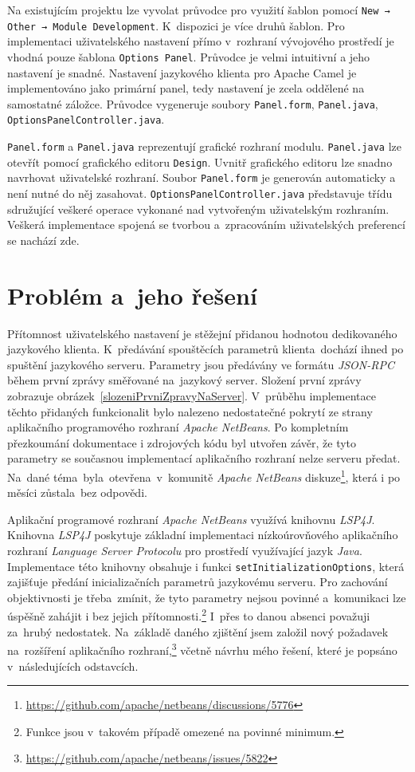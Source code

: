Na existujícím projektu lze vyvolat průvodce pro využití šablon pomocí \texttt{New → Other → Module Development}. K~dispozici je více druhů šablon. Pro implementaci uživatelského nastavení přímo v~rozhraní vývojového prostředí je vhodná pouze šablona \texttt{Options Panel}. Průvodce je velmi intuitivní a jeho nastavení je snadné. Nastavení jazykového klienta pro Apache Camel je implementováno jako primární panel, tedy nastavení je zcela oddělené na samostatné záložce. Průvodce vygeneruje soubory \texttt{Panel.form}, \texttt{Panel.java}, \texttt{OptionsPanelController.java}.

\texttt{Panel.form} a \texttt{Panel.java} reprezentují grafické rozhraní modulu. \texttt{Panel.java} lze ote\-vřít pomocí grafického editoru \texttt{Design}. Uvnitř grafického editoru lze snadno navrhovat uživatelské rozhraní. Soubor \texttt{Panel.form} je generován automaticky a není nutné do něj zasahovat. \texttt{OptionsPanelController.java} představuje třídu sdružující veškeré operace vykonané nad vytvořeným uživatelským rozhraním. Veškerá implementace spojená se tvorbou a~zpracováním uživatelských preferencí se nachází zde.

\section{Problém a~jeho řešení}
Přítomnost uživatelského nastavení je stěžejní přidanou hodnotou dedikovaného jazykového klienta. K~předávání spouštěcích parametrů klienta~dochází ihned po spuštění jazykového serveru. Parametry jsou předávány ve formátu \emph{JSON-RPC} během první zprávy směřované na~jazykový server. Složení první zprávy zobrazuje obrázek~\ref{slozeniPrvniZpravyNaServer}. V~průběhu implementace těchto přidaných funkcionalit bylo nalezeno nedostatečné pokrytí ze strany aplikačního programového rozhraní \emph{Apache NetBeans}. Po kompletním přezkoumání dokumentace i zdrojových kódu byl utvořen závěr, že tyto parametry se současnou implementací aplikačního rozhraní nelze serveru předat. Na~dané téma~byla~otevřena~v~komunitě \emph{Apache NetBeans} diskuze\footnote{\url{https://github.com/apache/netbeans/discussions/5776}}, která i po měsíci zůstala~bez odpovědi.

Aplikační programové rozhraní \emph{Apache NetBeans} využívá knihovnu \emph{LSP4J}. Knihovna \emph{LSP4J} poskytuje základní implementaci nízkoúrovňového aplikačního rozhraní \emph{Language Server Protocolu} pro prostředí využívající jazyk \emph{Java}. Implementace této knihovny obsahuje i funkci \texttt{setInitializationOptions}, která zajišťuje předání inicializačních parametrů jazykovému serveru. Pro zachování objektivnosti je třeba~zmínit, že tyto parametry nejsou povinné a~komunikaci lze úspěšně zahájit i bez jejich přítomnosti.\footnote{Funkce jsou v~takovém případě omezené na povinné minimum.} I~přes to danou absenci považuji za~hrubý nedostatek. Na~základě daného zjištění jsem založil nový požadavek na~rozšíření aplikačního rozhraní,\footnote{\url{https://github.com/apache/netbeans/issues/5822}} včetně návrhu mého řešení, které je popsáno v~následujících odstavcích. 

